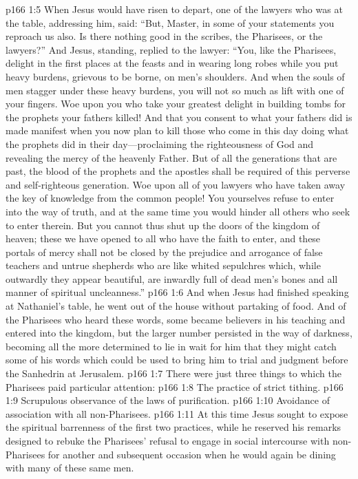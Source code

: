 \pc \vs p166 1:5 When Jesus would have risen to depart, one of the lawyers who was at the table, addressing him, said: “But, Master, in some of your statements you reproach us also. Is there nothing good in the scribes, the Pharisees, or the lawyers?” And Jesus, standing, replied to the lawyer: \textcolor{ubdarkred}{“You, like the Pharisees, delight in the first places at the feasts and in wearing long robes while you put heavy burdens, grievous to be borne, on men’s shoulders. And when the souls of men stagger under these heavy burdens, you will not so much as lift with one of your fingers. Woe upon you who take your greatest delight in building tombs for the prophets your fathers killed! And that you consent to what your fathers did is made manifest when you now plan to kill those who come in this day doing what the prophets did in their day---proclaiming the righteousness of God and revealing the mercy of the heavenly Father. But of all the generations that are past, the blood of the prophets and the apostles shall be required of this perverse and self\hyp{}righteous generation. Woe upon all of you lawyers who have taken away the key of knowledge from the common people! You yourselves refuse to enter into the way of truth, and at the same time you would hinder all others who seek to enter therein. But you cannot thus shut up the doors of the kingdom of heaven; these we have opened to all who have the faith to enter, and these portals of mercy shall not be closed by the prejudice and arrogance of false teachers and untrue shepherds who are like whited sepulchres which, while outwardly they appear beautiful, are inwardly full of dead men’s bones and all manner of spiritual uncleanness.”}
\vs p166 1:6 And when Jesus had finished speaking at Nathaniel’s table, he went out of the house without partaking of food. And of the Pharisees who heard these words, some became believers in his teaching and entered into the kingdom, but the larger number persisted in the way of darkness, becoming all the more determined to lie in wait for him that they might catch some of his words which could be used to bring him to trial and judgment before the Sanhedrin at Jerusalem.
\pc \vs p166 1:7 There were just three things to which the Pharisees paid particular attention:
\pc \vs p166 1:8 \bibnobreakspace The practice of strict tithing.
\vs p166 1:9 \bibnobreakspace Scrupulous observance of the laws of purification.
\vs p166 1:10 \bibnobreakspace Avoidance of association with all non\hyp{}Pharisees.
\pc \vs p166 1:11 At this time Jesus sought to expose the spiritual barrenness of the first two practices, while he reserved his remarks designed to rebuke the Pharisees’ refusal to engage in social intercourse with non\hyp{}Pharisees for another and subsequent occasion when he would again be dining with many of these same men.
